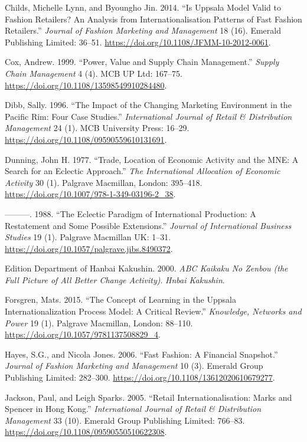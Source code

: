 \documentclass[hyperref, a4paper]{ctexart}
\begin{document}
\leavevmode\hypertarget{ref-innovative7}{}%
Childs, Michelle Lynn, and Byoungho Jin. 2014. ``Is Uppsala Model Valid
to Fashion Retailers? An Analysis from Internationalisation Patterns of
Fast Fashion Retailers.'' \emph{Journal of Fashion Marketing and
Management} 18 (16). Emerald Publishing Limited: 36--51.
\url{https://doi.org/10.1108/JFMM-10-2012-0061}.

\leavevmode\hypertarget{ref-innovative2}{}%
Cox, Andrew. 1999. ``Power, Value and Supply Chain Management.''
\emph{Supply Chain Management} 4 (4). MCB UP Ltd: 167--75.
\url{https://doi.org/10.1108/13598549910284480}.

\leavevmode\hypertarget{ref-innovative8}{}%
Dibb, Sally. 1996. ``The Impact of the Changing Marketing Environment in
the Pacific Rim: Four Case Studies.'' \emph{International Journal of
Retail \& Distribution Management} 24 (1). MCB University Press: 16--29.
\url{https://doi.org/10.1108/09590559610131691}.

\leavevmode\hypertarget{ref-innovative9}{}%
Dunning, John H. 1977. ``Trade, Location of Economic Activity and the
MNE: A Search for an Eclectic Approach.'' \emph{The International
Allocation of Economic Activity} 30 (1). Palgrave Macmillan, London:
395--418. \url{https://doi.org/10.1007/978-1-349-03196-2_38}.

\leavevmode\hypertarget{ref-innovative10}{}%
---------. 1988. ``The Eclectic Paradigm of International Production: A
Restatement and Some Possible Extensions.'' \emph{Journal of
International Business Studies} 19 (1). Palgrave Macmillan UK: 1--31.
\url{https://doi.org/10.1057/palgrave.jibs.8490372}.

\leavevmode\hypertarget{ref-innovative3}{}%
Edition Department of Hanbai Kakushin. 2000. \emph{ABC Kaikaku No Zenbou
(the Full Picture of All Better Change Activity)}. \emph{Hnbai
Kakushin}.

\leavevmode\hypertarget{ref-innovative11}{}%
Forsgren, Mats. 2015. ``The Concept of Learning in the Uppsala
Internationalization Process Model: A Critical Review.''
\emph{Knowledge, Networks and Power} 19 (1). Palgrave Macmillan, London:
88--110. \url{https://doi.org/10.1057/9781137508829_4}.

\leavevmode\hypertarget{ref-innovative12}{}%
Hayes, S.G., and Nicola Jones. 2006. ``Fast Fashion: A Financial
Snapshot.'' \emph{Journal of Fashion Marketing and Management} 10 (3).
Emerald Group Publishing Limited: 282--300.
\url{https://doi.org/10.1108/13612020610679277}.

\leavevmode\hypertarget{ref-innovative13}{}%
Jackson, Paul, and Leigh Sparks. 2005. ``Retail Internationalisation:
Marks and Spencer in Hong Kong.'' \emph{International Journal of Retail
\& Distribution Management} 33 (10). Emerald Group Publishing Limited:
766--83. \url{https://doi.org/10.1108/09590550510622308}.
\end{document}
